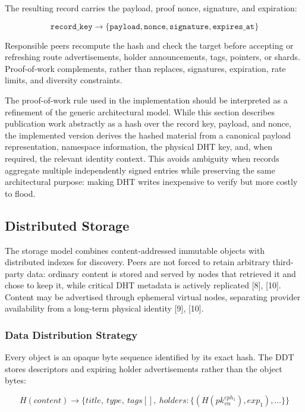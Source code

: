 \documentclass[12pt,a4paper]{article}
\begin{document}
The resulting record carries the payload, proof nonce, signature, and expiration:

\[
\texttt{record\_key} \rightarrow
\{
\texttt{payload},
\texttt{nonce},
\texttt{signature},
\texttt{expires\_at}
\}
\]

Responsible peers recompute the hash and check the target before accepting or
refreshing route advertisements, holder announcements, tags, pointers, or shards.
Proof-of-work complements, rather than replaces, signatures, expiration, rate
limits, and diversity constraints.

The proof-of-work rule used in the implementation should be interpreted as a refinement of the generic architectural model. While this section describes publication work abstractly as a hash over the record key, payload, and nonce, the implemented version derives the hashed material from a canonical payload representation, namespace information, the physical DHT key, and, when required, the relevant identity context. This avoids ambiguity when records aggregate multiple independently signed entries while preserving the same architectural purpose: making DHT writes inexpensive to verify but more costly to flood.






\subsection{Distributed Storage}

The storage model combines content-addressed immutable objects with distributed
indexes for discovery. Peers are not forced to retain arbitrary third-party data:
ordinary content is stored and served by nodes that retrieved it and chose to keep
it, while critical DHT metadata is actively replicated [8], [10]. Content may be
advertised through ephemeral virtual nodes, separating provider availability from a
long-term physical identity [9], [10].

\subsubsection{Data Distribution Strategy}

Every object is an opaque byte sequence identified by its exact hash. The DDT stores
descriptors and expiring holder advertisements rather than the object bytes:

\[
H(content) \rightarrow \{title,\ type,\ tags[],\
holders:\{(H(pk_{vn}^{eph_1}),exp_1),\ldots\}\}
\]
\end{document}
